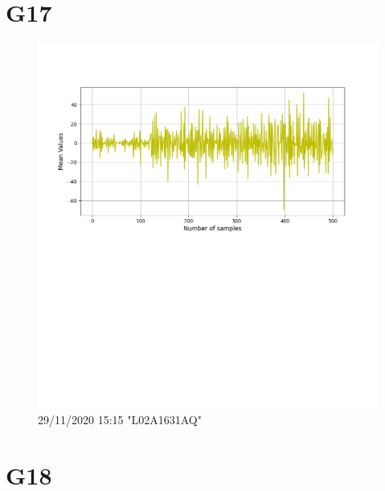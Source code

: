 \documentclass[hidelinks, 12pt, a4paper]{article}
\begin{document}
\section{G17}

\begin{figure}[h!]
\centering
	\includegraphics[height=.38\textheight, width=\textwidth]{assets/session2/g17.png}
    \caption{29/11/2020 15:15 "L02A1631AQ"}
\end{figure}



\section{G18}
\end{document}
